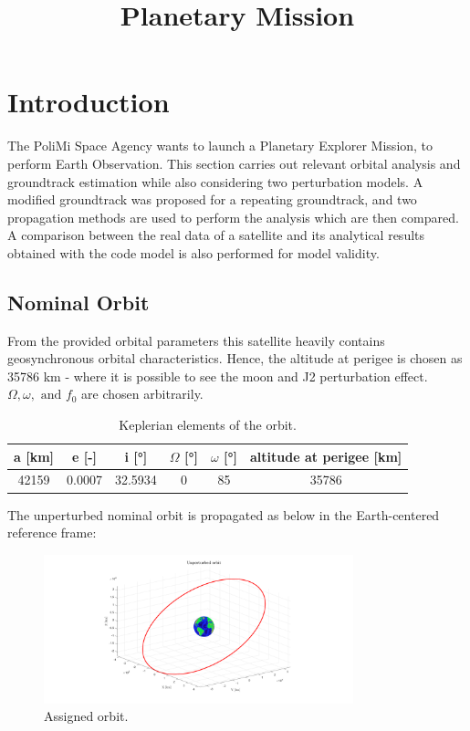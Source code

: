 \documentclass{article}
\title{Planetary Mission}
\begin{document}
	
	
\section{Introduction}
The  PoliMi  Space  Agency  wants  to  launch  a  Planetary  Explorer  Mission,  to  perform  Earth Observation. This section carries out relevant orbital analysis and groundtrack estimation while also considering two perturbation models. A modified groundtrack was proposed for a repeating groundtrack, and two propagation methods are used to perform the analysis which are then compared. A comparison between the real data of a satellite and its analytical results obtained with the code model is also performed for model validity. 

\subsection{Nominal Orbit}

From the provided orbital parameters this satellite heavily contains geosynchronous orbital characteristics. Hence, the altitude at perigee is chosen as 35786 km - where it is possible to see the moon and J2 perturbation effect. $\Omega, \omega, \text{ and } f_0$ are chosen arbitrarily.


\begin{table}[ht]
	\centering
	\label{tab:keplerian_elements}
	\begin{tabular}{|c|c|c|c|c|c|}
		\hline
		a [km] & e [-] & i [°] & $\Omega$ [°] & $\omega$ [°] & altitude at perigee [km] \\
		\hline
		42159 & 0.0007 & 32.5934 & 0 & 85 & 35786 \\
		\hline
	\end{tabular}
	\caption{Keplerian elements of the orbit.}
	\label{tab:keplerian_elements}
\end{table}
\begin{flushleft}
	The unperturbed nominal orbit is propagated as below in the Earth-centered reference frame:
\end{flushleft}

\begin{figure}[ht]
	\centering
	\includegraphics[width=0.8\textwidth]{nominal_orbit.png}
	\caption{Assigned orbit.}
	\label{fig:nominal_orbit}
\end{figure}
\end{document}
